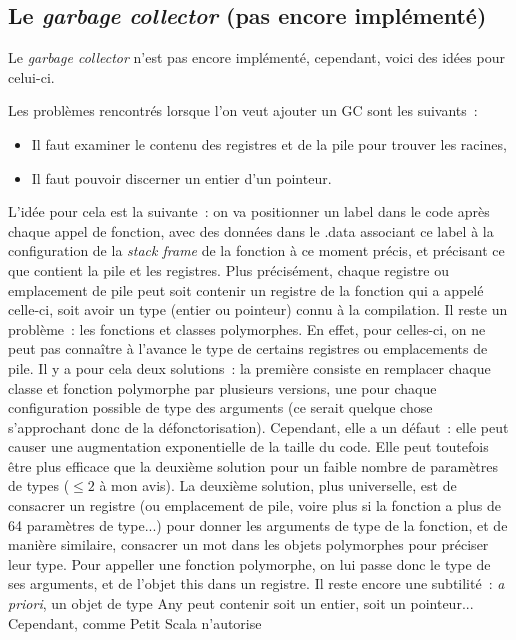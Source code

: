 \documentclass[a4paper,10pt]{article}
\newcommand{\code}[1]{{\fontfamily{pcr}\selectfont #1}}
\begin{document}
\subsection{Le \textit{garbage collector} (pas encore implémenté)}
Le \textit{garbage collector} n'est pas encore implémenté, cependant,
voici des idées pour celui-ci.\\ \par
Les problèmes rencontrés lorsque l'on veut ajouter un GC sont les
suivants~:
\begin{itemize}
\item{Il faut examiner le contenu des registres et de la pile pour
    trouver les racines,}
\item{Il faut pouvoir discerner un entier d'un pointeur.}
\end{itemize} \par
L'idée pour cela est la suivante~: on va positionner un label dans le
code après chaque appel de fonction, avec des données dans le
\code{.data} associant ce label à la configuration de la \textit{stack
  frame} de la fonction à ce moment précis, et précisant ce que
contient la pile et les registres. Plus précisément, chaque registre
ou emplacement de pile peut soit contenir un registre de la fonction
qui a appelé celle-ci, soit avoir un type (entier ou pointeur) connu à
la compilation. Il reste un problème~: les fonctions et classes
polymorphes. En effet, pour celles-ci, on ne peut pas connaître à
l'avance le type de certains registres ou emplacements de pile. Il y a
pour cela deux solutions~: la première consiste en remplacer chaque
classe et fonction polymorphe par plusieurs versions, une pour chaque
configuration possible de type des arguments (ce serait quelque chose
s'approchant donc de la défonctorisation). Cependant, elle a un
défaut~: elle peut causer une augmentation exponentielle de la taille
du code. Elle peut toutefois être plus efficace que la deuxième
solution pour un faible nombre de paramètres de types ($\leqslant 2$ à
mon avis). La deuxième solution, plus universelle, est de consacrer un
registre (ou emplacement de pile, voire plus si la fonction a plus de
64 paramètres de type...) pour donner les arguments de type de la
fonction, et de manière similaire, consacrer un mot dans les objets
polymorphes pour préciser leur type. Pour appeller une fonction
polymorphe, on lui passe donc le type de ses arguments, et de l'objet
\code{this} dans un registre. Il reste encore une subtilité~:
\textit{a priori}, un objet de type \code{Any} peut contenir soit un
entier, soit un pointeur... Cependant, comme Petit Scala n'autorise
\end{document}
